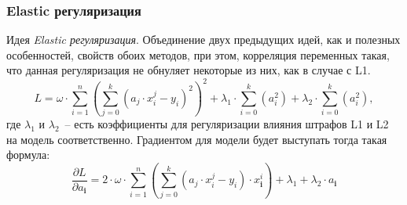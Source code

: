 \documentclass[12pt, a4paper, oneside, final]{article}
\begin{document}
	\subsubsection*{Elastic регуляризация}
	Идея \textit{Elastic регуляризация}.
	Объединение двух предыдущих идей, как и полезных особенностей, свойств обоих методов, при этом, корреляция переменных такая, что данная регуляризация не обнуляет некоторые из них, как в случае с L1.
	\[
		L = \omega \cdot \sum\limits_{i = 1}^{n}{\left(\sum\limits_{j = 0}^{k}{\left(a_{j} \cdot x_{i}^{j} - y_{i}\right)^{2}}\right)^{2}} + \lambda_{1} \cdot \sum\limits_{i = 0}^{k}{\left(a_{i}^{2}\right)} + \lambda_{2} \cdot \sum\limits_{i = 0}^{k}{\left(a_{i}^{2}\right)},
	\]
	где $\lambda_{1}$ и $\lambda_{2}$~-- есть коэффициенты для регуляризации влияния штрафов L1 и L2 на модель соответственно.
	Градиентом для модели будет выступать тогда такая формула:
	\[
		\dfrac{\partial{L}}{\partial{a_{\mathbf{i}}}} = 2 \cdot \omega \cdot \sum\limits_{i = 1}^{n}{\left(\sum\limits_{j = 0}^{k}{\left(a_{j} \cdot x_{i}^{j} - y_{i}\right) \cdot x^{i}_{\mathbf{i}}}\right)} + \lambda_{1} + \lambda_{2} \cdot a_{\mathbf{i}}
	\]
\end{document}
